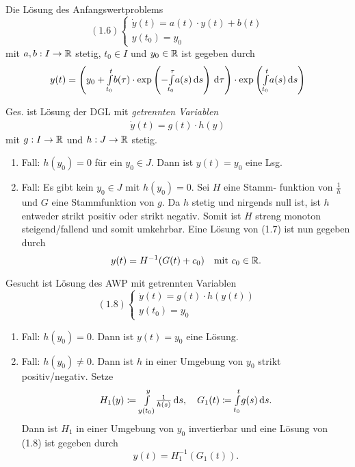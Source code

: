 \documentclass{cheat-sheet}
\begin{document}
\begin{kor}
  Die Lösung des Anfangswertproblems
  \[
    (1.6) \left\{ \begin{array}{l}
      \dot{y}(t) = a(t) \cdot y(t) + b(t)\\
      y(t_0) = y_0
    \end{array} \right.
  \]
  mit $a, b : I \to \mathbb{R}$ stetig, $t_0 \in I$ und $y_0 \in \mathbb{R}$ ist gegeben durch
  \[ y(t) = \left( y_0 + {\textstyle \int\limits_{t_0}^{t}} b(\tau) \cdot \exp\left( - {\textstyle \int\limits_{t_0}^{\tau}} a(s) \,\mathrm{d} s \right) \,\mathrm{d} \tau \right) \cdot \exp\left( {\textstyle \int\limits_{t_0}^{t}} a(s) \,\mathrm{d} s \right) \]
\end{kor}

\begin{prob}
  Ges. ist Lösung der DGL mit \emph{getrennten Variablen}
  \begin{align}
    \dot{y}(t) = g(t) \cdot h(y) \tag{1.7}
  \end{align}
  mit $g : I \to \mathbb{R}$ und $h : J \to \mathbb{R}$ stetig.
\end{prob}

\begin{lsg}
  \begin{enumerate}
    \item Fall: $h(y_0) = 0$ für ein $y_0 \in J$. Dann ist $y(t) = y_0$ eine Lsg.
    \item Fall: Es gibt kein $y_0 \in J$ mit $h(y_0) = 0$. Sei $H$ eine Stamm- funktion von $\tfrac{1}{h}$ und $G$ eine Stammfunktion von $g$. Da $h$ stetig und nirgends null ist, ist $h$ entweder strikt positiv oder strikt negativ. Somit ist $H$ streng monoton steigend/fallend und somit umkehrbar. Eine Lösung von (1.7) ist nun gegeben durch
    \[ y(t) = H^{-1}(G(t) + c_0) \quad \text{mit $c_0 \in \mathbb{R}$.} \]
  \end{enumerate}
\end{lsg}

\begin{prob}
  Gesucht ist Lösung des AWP mit getrennten Variablen
  \[
    (1.8) \left\{ \begin{array}{l}
      \dot{y}(t) = g(t) \cdot h(y(t))\\
      y(t_0) = y_0
    \end{array} \right.
  \]
\end{prob}

\begin{lsg}
  \begin{enumerate}
    \item Fall: $h(y_0) = 0$. Dann ist $y(t) = y_0$ eine Lösung.
    \item Fall: $h(y_0) \not= 0$. Dann ist $h$ in einer Umgebung von $y_0$ strikt positiv/negativ. Setze
    \[
      H_1(y) \coloneqq {\textstyle \int\limits_{y(t_0)}^{y}} \tfrac{1}{h(s)} \,\mathrm{d} s, \quad
      G_1(t) \coloneqq {\textstyle \int\limits_{t_0}^{t}} g(s) \,\mathrm{d} s.
    \]
    Dann ist $H_1$ in einer Umgebung von $y_0$ invertierbar und eine Lösung von (1.8) ist gegeben durch
    \[ y(t) = H_1^{-1}(G_1(t)). \]
  \end{enumerate}
\end{lsg}
\end{document}
